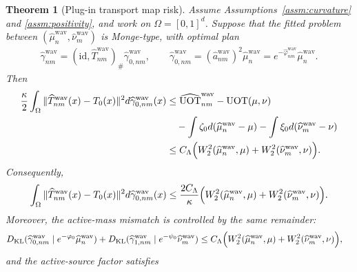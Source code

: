 \documentclass[11pt,reqno]{amsart}
\newtheorem{theorem}{Theorem}
\theoremstyle{definition}
\newcommand{\KL}{\mathrm{KL}}
\renewcommand{\hat}{\widehat}
\begin{document}
\begin{theorem}[Plug-in transport map risk]
\label{thm:uot_plugin_map_risk}
Assume Assumptions~\ref{assm:curvature} and \ref{assm:positivity}, and work on $\Omega=[0,1]^d$.
Suppose that the fitted problem between $(\hat\mu_n^{\mathrm{wav}},\hat\nu_m^{\mathrm{wav}})$ is Monge-type, with optimal plan
\begin{align*}
    \hat\gamma_{nm}^{\mathrm{wav}} = (\mathrm{id},\hat T_{nm}^{\mathrm{wav}})_\#\hat\gamma_{0,nm}^{\mathrm{wav}},
    \qquad
    \hat\gamma_{0,nm}^{\mathrm{wav}} = (\hat a_{nm}^{\mathrm{wav}})^2\hat\mu_n^{\mathrm{wav}}
    = e^{-\hat\varphi_{nm}^{\mathrm{wav}}}\hat\mu_n^{\mathrm{wav}}.
\end{align*}
Then
\begin{equation}
\label{eq:uot_plugin_map_risk_main}
\begin{aligned}
\frac{\kappa}{2}
\int_{\Omega}
\|\hat T_{nm}^{\mathrm{wav}}(x)-T_0(x)\|^2 d\hat\gamma_{0,nm}^{\mathrm{wav}}(x)
&\le
\widehat{\mathrm{UOT}}_{nm}^{\mathrm{wav}}
- \mathrm{UOT}(\mu,\nu) \\
&\quad - \int \zeta_0 d(\hat\mu_n^{\mathrm{wav}}-\mu)
- \int \xi_0 d(\hat\nu_m^{\mathrm{wav}}-\nu) \\
&\le
C_\Lambda\Bigl(
W_2^2(\hat\mu_n^{\mathrm{wav}},\mu)
+
W_2^2(\hat\nu_m^{\mathrm{wav}},\nu)
\Bigr).
\end{aligned}
\end{equation}
Consequently,
\begin{align}
\label{eq:uot_plugin_map_risk_rate}
    \int_{\Omega}
    \|\hat T_{nm}^{\mathrm{wav}}(x)-T_0(x)\|^2 d\hat\gamma_{0,nm}^{\mathrm{wav}}(x)
    \le
    \frac{2C_\Lambda}{\kappa}
    \Bigl(
        W_2^2(\hat\mu_n^{\mathrm{wav}},\mu)
        +
        W_2^2(\hat\nu_m^{\mathrm{wav}},\nu)
    \Bigr).
\end{align}
Moreover, the active-mass mismatch is controlled by the same remainder:
\begin{equation}
\label{eq:uot_plugin_active_mass_mismatch}
\begin{aligned}
&{D_\KL}(\hat\gamma_{0,nm}^{\mathrm{wav}}\mid e^{-\varphi_0}\hat\mu_n^{\mathrm{wav}})
+
{D_\KL}(\hat\gamma_{1,nm}^{\mathrm{wav}}\mid e^{-\psi_0}\hat\nu_m^{\mathrm{wav}}) \le
C_\Lambda\Bigl(
W_2^2(\hat\mu_n^{\mathrm{wav}},\mu)
+
W_2^2(\hat\nu_m^{\mathrm{wav}},\nu)
\Bigr),
\end{aligned}
\end{equation}
and the active-source factor satisfies
\begin{align}
\label{eq:uot_plugin_active_factor_bound}

\end{align}
\end{theorem}
\end{document}
